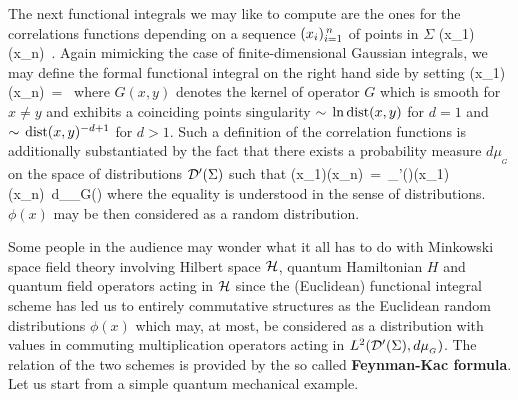 The next functional integrals we may like to compute
are the ones for the correlations functions depending
on a sequence $(x_i)_{i=1}^{\hspace{0.05cm} n}$ of points in $\Sigma$
\qq
\langle\phi(x_1)\s\cdots\s\phi(x_n)\rangle\
\equiv{}\s.
\non
\qqq
Again mimicking the case of finite-dimensional Gaussian integrals,
we may define the formal functional integral on the right hand side
by setting
\qq
\langle\phi(x_1)\s\cdots\s\phi(x_n)\rangle\ =\ 
\non
\qqq
where $G(x,y)$ denotes the kernel of operator $G$
which is smooth for $x\not=y$ and exhibits a coinciding points
singularity $\sim\hspace{0.05cm}\ln {\rm dist}(x,y)$
for $d=1$ and $\sim\hspace{0.05cm}{\rm dist}(x,y)^{-d+1}$ for $d>1$.
Such a definition of the correlation functions is additionally
substantiated by the fact that there exists a probability
measure $d\mu_{_G}$ on the space of distributions ${\cal D}'(\Sigma)$ such
that
\qq
\langle\phi(x_1)\s\cdots\s\phi(x_n)\rangle\ =\
\int\limits_{\CD'(\Sigma)}\phi(x_1)\s\cdots\s\phi(x_n)\ d\mu_{_G}(\phi)
\non
\qqq
where the equality is understood in the sense of distributions.
$\phi(x)$ may be then considered as a random distribution.
\vskip 1cm

\vskip 0.4cm

\no Some people in the audience may wonder what it all has
to do with Minkowski space field theory involving Hilbert space
${\cal H}$, quantum Hamiltonian $H$ and quantum field operators
acting in ${\cal H}$ since the (Euclidean) functional integral
scheme has led us to entirely commutative structures
as the Euclidean random distributions $\phi(x)$ which may, at
most, be considered as a distribution with values in commuting
multiplication operators acting in $L^2({\cal D}'(\Sigma),d\mu_{_G})$.
The relation of the two schemes is provided by the so called
{\bf Feynman-Kac formula}. Let us start from a simple
quantum mechanical example.
\vskip 0.5cm

